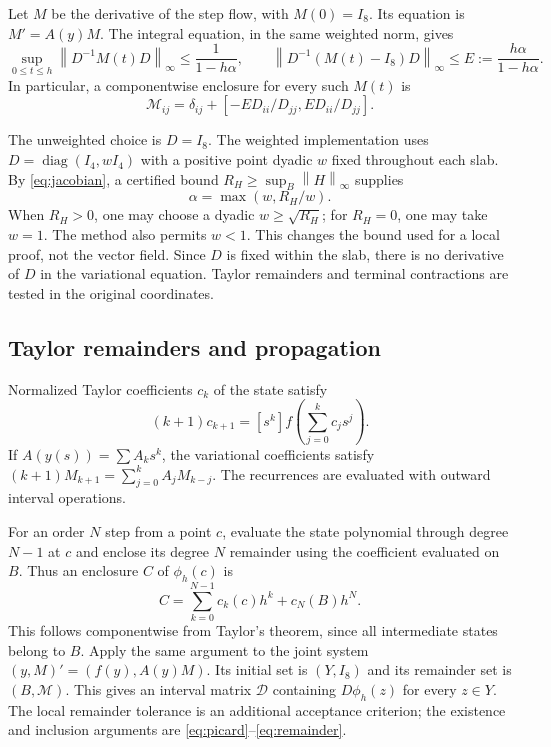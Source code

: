 \documentclass[10pt,a4paper]{article}
\theoremstyle{remark}
\newcommand{\norm}[1]{\left\lVert #1\right\rVert_\infty}
\begin{document}
Let $M$ be the derivative of the step flow, with $M(0)=I_8$. Its
equation is $M'=A(y)M$. The integral equation, in the same weighted
norm, gives
\begin{equation}
 \sup_{0\le t\le h}\norm{D^{-1}M(t)D}
 \le\frac1{1-h\alpha},\qquad
 \norm{D^{-1}(M(t)-I_8)D}\le E:=\frac{h\alpha}{1-h\alpha}.
 \label{eq:variation}
\end{equation}
In particular, a componentwise enclosure for every such $M(t)$ is
\begin{equation}
 \mathcal M_{ij}=\delta_{ij}+[-E D_{ii}/D_{jj},E D_{ii}/D_{jj}].
 \label{eq:Mbox}
\end{equation}

The unweighted choice is $D=I_8$. The weighted implementation uses
$D=\operatorname{diag}(I_4,wI_4)$ with a positive point dyadic $w$ fixed
throughout each slab. By \eqref{eq:jacobian}, a certified bound
$R_H\ge\sup_B\norm{H}$ supplies
\begin{equation}
 \alpha=\max(w,R_H/w).
 \label{eq:weight}
\end{equation}
When $R_H>0$, one may choose a dyadic $w\ge\sqrt{R_H}$; for $R_H=0$,
one may take $w=1$. The method also permits $w<1$. This changes the
bound used for a local proof, not the vector field. Since $D$ is fixed
within the slab, there is no derivative of $D$ in the variational
equation. Taylor remainders and terminal contractions are tested in
the original coordinates.

\subsection{Taylor remainders and propagation}
Normalized Taylor coefficients $c_k$ of the state satisfy
\begin{equation}
 (k+1)c_{k+1}=[s^k]f\left(\sum_{j=0}^k c_js^j\right).
 \label{eq:taylor}
\end{equation}
If $A(y(s))=\sum A_ks^k$, the variational coefficients satisfy
$(k+1)M_{k+1}=\sum_{j=0}^k A_jM_{k-j}$. The recurrences are evaluated
with outward interval operations.

For an order $N$ step from a point $c$, evaluate the state polynomial
through degree $N-1$ at $c$ and enclose its degree $N$ remainder using
the coefficient evaluated on $B$. Thus an enclosure $C$ of $\phi_h(c)$
is
\begin{equation}
 C=\sum_{k=0}^{N-1}c_k(c)h^k+c_N(B)h^N.
 \label{eq:remainder}
\end{equation}
This follows componentwise from Taylor's theorem, since all intermediate
states belong to $B$. Apply the same argument to the joint system
$(y,M)'=(f(y),A(y)M)$. Its initial set is $(Y,I_8)$ and its remainder
set is $(B,\mathcal M)$. This gives an interval matrix $\mathcal D$
containing $D\phi_h(z)$ for every $z\in Y$. The local remainder
tolerance is an additional acceptance criterion; the existence and
inclusion arguments are \eqref{eq:picard}--\eqref{eq:remainder}.
\end{document}
